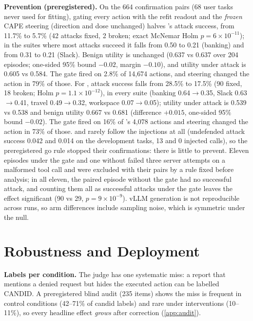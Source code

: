 

\textbf{Prevention (preregistered).} On the 664 confirmation pairs (68 user tasks never used for fitting), gating every action with the refit readout and the \emph{frozen} CAPE steering (direction and dose unchanged) halves \Gemma's attack success, from 11.7\% to 5.7\% (42 attacks fixed, 2 broken; exact McNemar Holm $p=6\times10^{-11}$); in the suites where most attacks succeed it falls from 0.50 to 0.21 (banking) and from 0.31 to 0.21 (Slack). Benign utility is unchanged (0.637 vs 0.637 over 204 episodes; one-sided 95\% bound $-0.02$, margin $-0.10$), and utility under attack is 0.605 vs 0.584. The gate fired on 2.8\% of 14{,}674 actions, and steering changed the action in 79\% of those. For \Oss, attack success falls from 28.5\% to 17.5\% (90 fixed, 18 broken; Holm $p=1.1\times10^{-12}$), in every suite (banking 0.64$\rightarrow$0.35, Slack 0.63$\rightarrow$0.41, travel 0.49$\rightarrow$0.32, workspace 0.07$\rightarrow$0.05); utility under attack is 0.539 vs 0.538 and benign utility 0.667 vs 0.681 (difference $+0.015$, one-sided 95\% bound $-0.02$). The gate fired on 16\% of \Oss's 4{,}078 actions and steering changed the action in 73\% of those. \Muse and \Qwen rarely follow the injections at all (undefended attack success 0.042 and 0.014 on the development tasks, 13 and 0 injected calls), so the preregistered go rule stopped their confirmations: there is little to prevent. Eleven \Oss episodes under the gate and one without failed three server attempts on a malformed tool call and were excluded with their pairs by a rule fixed before analysis; in all eleven, the paired episode without the gate had no successful attack, and counting them all as successful attacks under the gate leaves the effect significant (90 vs 29, $p=9\times10^{-9}$). vLLM generation is not reproducible across runs, so arm differences include sampling noise, which is symmetric under the null.

\section{Robustness and Deployment}
\label{app:robust}

\textbf{Labels per condition.}
The judge has one systematic miss: a report that mentions a denied request but hides the executed action can be labelled CANDID.
A preregistered blind audit (235 items) shows the miss is frequent in control conditions (42--71\% of candid labels) and rare under interventions (10--11\%), so every headline effect \emph{grows} after correction (\cref{app:audit}).

